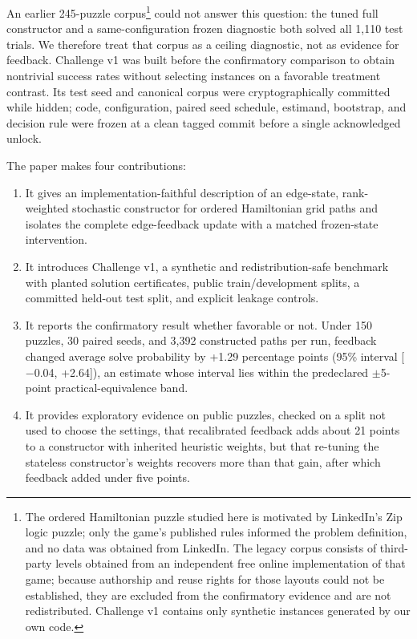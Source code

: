 \documentclass[pdflatex,sn-basic,iicol]{sn-jnl}
\begin{document}
An earlier 245-puzzle corpus\footnote{The ordered Hamiltonian puzzle studied here is motivated by LinkedIn's Zip logic puzzle; only the game's published rules informed the problem definition, and no data was obtained from LinkedIn. The legacy corpus consists of third-party levels obtained from an independent free online implementation of that game; because authorship and reuse rights for those layouts could not be established, they are excluded from the confirmatory evidence and are not redistributed. Challenge v1 contains only synthetic instances generated by our own code.} could not answer this question: the tuned full constructor and a same-configuration frozen diagnostic both solved all 1,110 test trials. We therefore treat that corpus as a ceiling diagnostic, not as evidence for feedback. Challenge v1 was built before the confirmatory comparison to obtain nontrivial success rates without selecting instances on a favorable treatment contrast. Its test seed and canonical corpus were cryptographically committed while hidden; code, configuration, paired seed schedule, estimand, bootstrap, and decision rule were frozen at a clean tagged commit before a single acknowledged unlock.

The paper makes four contributions:

\begin{enumerate}
\item It gives an implementation-faithful description of an edge-state, rank-weighted stochastic constructor for ordered Hamiltonian grid paths and isolates the complete edge-feedback update with a matched frozen-state intervention.
\item It introduces Challenge v1, a synthetic and redistribution-safe benchmark with planted solution certificates, public train/development splits, a committed held-out test split, and explicit leakage controls.
\item It reports the confirmatory result whether favorable or not. Under 150 puzzles, 30 paired seeds, and 3,392 constructed paths per run, feedback changed average solve probability by +1.29 percentage points (95\% interval [\(-\)0.04, +2.64]), an estimate whose interval lies within the predeclared \(\pm\)5-point practical-equivalence band.
\item It provides exploratory evidence on public puzzles, checked on a split not used to choose the settings, that recalibrated feedback adds about 21 points to a constructor with inherited heuristic weights, but that re-tuning the stateless constructor's weights recovers more than that gain, after which feedback added under five points.
\end{enumerate}
\end{document}
